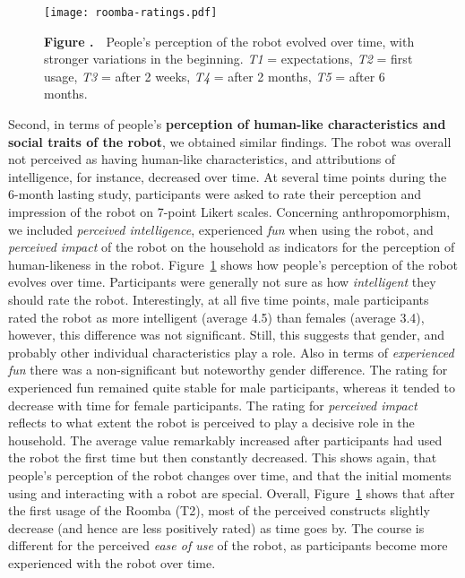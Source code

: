 \documentclass{frontiersSCNS} %
\begin{document}
\begin{figure}
\begin{center}
\texttt{[image: roomba-ratings.pdf]}%
\end{center}
 \textbf{\label{fig:roomba-ratings} Figure .}{~~\small People's perception of the robot evolved over time, with stronger variations in the beginning. \textit{T1} = expectations, \textit{T2} = first usage, \textit{T3} = after 2 weeks, \textit{T4} = after 2 months, \textit{T5} = after 6 months.}
\end{figure}

Second, in terms of people's \textbf{perception of human-like characteristics and social traits of the robot}, we obtained similar findings. The robot was overall not perceived as having human-like characteristics, and attributions of intelligence, for instance, decreased over time.
At several time points during the 6-month lasting study, participants were asked to rate their perception and impression of the robot on 7-point Likert scales.
Concerning anthropomorphism, we included
\textit{perceived intelligence}, experienced \textit{fun} when using the
robot, and \textit{perceived impact} of the robot on the household as indicators for the perception of human-likeness in the robot. Figure~\ref{fig:roomba-ratings} shows how people's perception of the robot evolves over time.
Participants were generally not sure as how \textit{intelligent} they should rate the robot. Interestingly, at all five time points, male participants rated the robot as more intelligent (average 4.5) than females (average 3.4), however, this difference was not significant. Still, this suggests that gender, and probably other individual characteristics play a role. Also in terms of \textit{experienced fun} there was a non-significant but noteworthy gender difference. The rating for experienced fun remained quite stable for male participants, whereas it tended to decrease with time for female participants. The rating for \textit{perceived impact} reflects to what extent the robot is perceived to play a decisive role in the household. The average value remarkably increased after participants had used the robot the first time but then constantly decreased. This shows again, that people's perception of the robot changes over time, and that the initial moments using and interacting with a robot are special.
Overall, Figure~\ref{fig:roomba-ratings} shows that after the first usage of
the Roomba (T2), most of the perceived constructs slightly decrease (and hence
are less positively rated) as time goes by. The course is different for the
perceived \textit{ease of use} of the robot, as participants become more
experienced with the robot over time.
\end{document}
